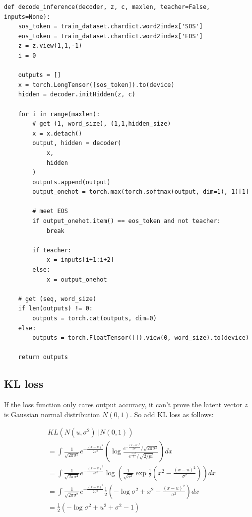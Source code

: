 \documentclass[12pt]{article}
\begin{document}
\begin{verbatim}
def decode_inference(decoder, z, c, maxlen, teacher=False, inputs=None):
    sos_token = train_dataset.chardict.word2index['SOS']
    eos_token = train_dataset.chardict.word2index['EOS']
    z = z.view(1,1,-1)
    i = 0
    
    outputs = []
    x = torch.LongTensor([sos_token]).to(device)
    hidden = decoder.initHidden(z, c)
    
    for i in range(maxlen):
        # get (1, word_size), (1,1,hidden_size)
        x = x.detach()
        output, hidden = decoder(
            x,
            hidden
        )
        outputs.append(output)
        output_onehot = torch.max(torch.softmax(output, dim=1), 1)[1]
        
        # meet EOS
        if output_onehot.item() == eos_token and not teacher:
            break
        
        if teacher:
            x = inputs[i+1:i+2]
        else:
            x = output_onehot
    
    # get (seq, word_size)
    if len(outputs) != 0:
        outputs = torch.cat(outputs, dim=0)
    else:
        outputs = torch.FloatTensor([]).view(0, word_size).to(device)
    
    return outputs
\end{verbatim}

\subsection{KL loss}

If the loss function only cares output accuracy, it can't prove the latent vector $z$ is Gaussian normal distribution $N(0, 1)$. So add KL loss as follows:

\begin{equation}
\begin{split}
& KL( N(u, \sigma^2) || N(0,1) ) \\ & = \int \frac{1}{\sqrt{2\pi \sigma^2}} e^{-\frac{(x-u)^2}{2\sigma^2}} \left( \log \frac{ e^{-\frac{(x-u)^2}{2\sigma^2}} / \sqrt{2\pi \sigma^2} }{ e^{\frac{-x^2}{2}} / \sqrt{2/pi} } \right) dx \\
& = \int \frac{1}{\sqrt{2\pi \sigma^2}} e^{-\frac{(x-u)^2}{2\sigma^2}} \log \left(  \frac{1}{\sqrt{\sigma^2}} \exp{\frac{1}{2} (x^2 - \frac{(x-u)^2}{\sigma^2}) } \right) dx \\
& = \int \frac{1}{\sqrt{2\pi \sigma^2}} e^{-\frac{(x-u)^2}{2\sigma^2}} \frac{1}{2} \left( -\log \sigma^2 + x^2 - \frac{(x-u)^2}{\sigma^2} \right) dx \\
& = \frac{1}{2} (-\log \sigma^2 + u^2 + \sigma^2 - 1)
\end{split}
\end{equation}
\end{document}
